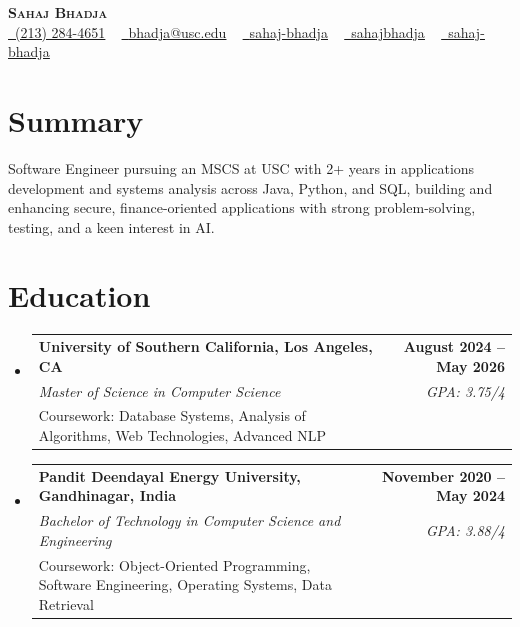 \documentclass[letterpaper,10pt]{article}
\makeatletter
\newcommand{\resumeEduSubheading}[5]{\vspace{-1pt}\item\begin{tabular*}{1.0\textwidth}[t]{l@{\extracolsep{\fill}}r}\textbf{#1} & \textbf{\small #2} \\\textit{\small #3} & \textit{\small #4} \\\small #5 & \\\end{tabular*}\vspace{-4pt}}
\newcommand{\resumeSubHeadingListStart}{\begin{itemize}[leftmargin=0.0in, label={}]}
\newcommand{\resumeSubHeadingListEnd}{\end{itemize}}
\makeatother
\begin{document}
\begin{center}
{\Huge \scshape \textbf{Sahaj Bhadja}} \\ \vspace{1pt}
\small \href{tel:(213) 284-4651}{\faPhone\ \underline{(213) 284-4651}} ~ \href{mailto: bhadja@usc.edu}{\raisebox{-0.2\height}\faEnvelope\ \underline{bhadja@usc.edu}} ~
\href{https://www.linkedin.com/in/sahaj-bhadja/}{\raisebox{-0.2\height}\faLinkedin\ \underline{sahaj-bhadja}} ~ \href{https://github.com/SAHAJ-BHADJA}{\raisebox{-0.2\height}\faGithub\ \underline{sahajbhadja}} ~
\href{https://sahaj-bhadja.vercel.app/}{\raisebox{-0.2\height}\faGlobe\ \underline{sahaj-bhadja}}
\end{center}
\vspace{-16pt}
\section{Summary}
\begin{itemize}[leftmargin=0.15in, label={}]
\small{\item{Software Engineer pursuing an MSCS at USC with 2+ years in applications development and systems analysis across Java, Python, and SQL, building and enhancing secure, finance-oriented applications with strong problem-solving, testing, and a keen interest in AI.}}
\end{itemize}
\vspace{-6pt}
\section{Education}
\resumeSubHeadingListStart
\resumeEduSubheading{University of Southern California, Los Angeles, CA}{August 2024 -- May 2026}{Master of Science in Computer Science}{GPA: 3.75/4}{Coursework: Database Systems, Analysis of Algorithms, Web Technologies, Advanced NLP}
\vspace{-9pt}
\resumeEduSubheading{Pandit Deendayal Energy University, Gandhinagar, India}{November 2020 -- May 2024}{Bachelor of Technology in Computer Science and Engineering}{GPA: 3.88/4}{Coursework: Object-Oriented Programming, Software Engineering, Operating Systems, Data Retrieval}
\resumeSubHeadingListEnd
\vspace{-6pt}
\end{document}
